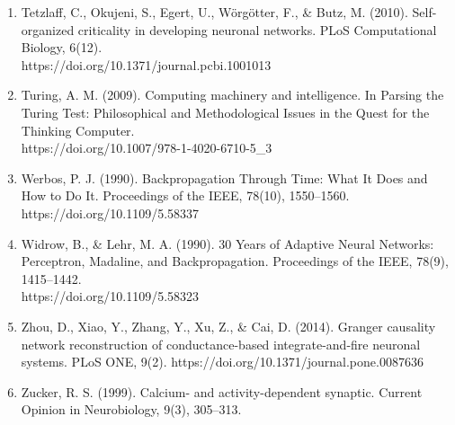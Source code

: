 \documentclass[11pt]{article}
\begin{document}
\begin{enumerate}
\item Tetzlaff, C., Okujeni, S., Egert, U., Wörgötter, F., \& Butz, M. (2010). Self-organized criticality in developing neuronal networks. PLoS Computational Biology, 6(12).\\https://doi.org/10.1371/journal.pcbi.1001013
\item Turing, A. M. (2009). Computing machinery and intelligence. In Parsing the Turing Test: Philosophical and Methodological Issues in the Quest for the Thinking Computer.\\https://doi.org/10.1007/978-1-4020-6710-5\_3
\item Werbos, P. J. (1990). Backpropagation Through Time: What It Does and How to Do It. Proceedings of the IEEE, 78(10), 1550–1560. https://doi.org/10.1109/5.58337
\item Widrow, B., \& Lehr, M. A. (1990). 30 Years of Adaptive Neural Networks: Perceptron, Madaline, and Backpropagation. Proceedings of the IEEE, 78(9), 1415–1442.\\https://doi.org/10.1109/5.58323
\item Zhou, D., Xiao, Y., Zhang, Y., Xu, Z., \& Cai, D. (2014). Granger causality network reconstruction of conductance-based integrate-and-fire neuronal systems. PLoS ONE, 9(2). https://doi.org/10.1371/journal.pone.0087636
\item Zucker, R. S. (1999). Calcium- and activity-dependent synaptic. Current Opinion in Neurobiology, 9(3), 305–313.
\end{enumerate}
\end{document}
